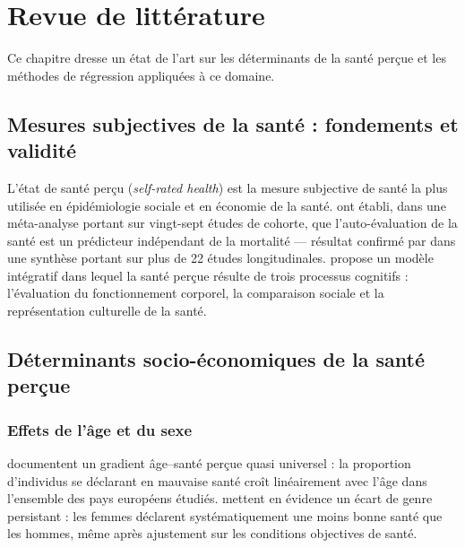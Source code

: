 \documentclass[11pt,a4paper]{memoirerecherche}
\begin{document}
\hypertarget{chap-litterature}{%
\section{Revue de littérature}\label{chap-litterature}}

Ce chapitre dresse un état de l'art sur les déterminants de la santé perçue et les méthodes de régression appliquées à ce domaine.

\hypertarget{mesures-subjectives-de-la-santuxe9-fondements-et-validituxe9}{%
\subsection{Mesures subjectives de la santé : fondements et validité}\label{mesures-subjectives-de-la-santuxe9-fondements-et-validituxe9}}

L'état de santé perçu (\emph{self-rated health}) est la mesure subjective de santé la plus utilisée en épidémiologie sociale et en économie de la santé. \textcite{idler1997} ont établi, dans une méta-analyse portant sur vingt-sept études de cohorte, que l'auto-évaluation de la santé est un prédicteur indépendant de la mortalité --- résultat confirmé par \textcite{desalvo2006} dans une synthèse portant sur plus de 22 études longitudinales. \textcite{jylha2009} propose un modèle intégratif dans lequel la santé perçue résulte de trois processus cognitifs : l'évaluation du fonctionnement corporel, la comparaison sociale et la représentation culturelle de la santé.

\hypertarget{duxe9terminants-socio-uxe9conomiques-de-la-santuxe9-peruxe7ue}{%
\subsection{Déterminants socio-économiques de la santé perçue}\label{duxe9terminants-socio-uxe9conomiques-de-la-santuxe9-peruxe7ue}}

\hypertarget{effets-de-luxe2ge-et-du-sexe}{%
\subsubsection{Effets de l'âge et du sexe}\label{effets-de-luxe2ge-et-du-sexe}}

\textcite{mackenbach1999} documentent un gradient âge--santé perçue quasi universel : la proportion d'individus se déclarant en mauvaise santé croît linéairement avec l'âge dans l'ensemble des pays européens étudiés. \textcite{bambra2009} mettent en évidence un écart de genre persistant : les femmes déclarent systématiquement une moins bonne santé que les hommes, même après ajustement sur les conditions objectives de santé.
\end{document}
